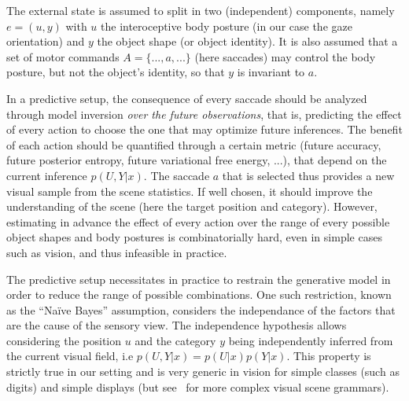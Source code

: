 The external state is assumed to split in two (independent) components, namely $e = (u,y)$ with $u$ the interoceptive body posture (in our case the gaze orientation) and $y$ the object shape (or object identity).
It is also assumed that a set of motor commands $A = \{..., a, ...\}$ (here saccades) may control the body posture, but not the object's identity, so that $y$ is invariant to $a$.

In a predictive setup, the consequence of every saccade should be analyzed through model inversion \emph{over the future observations}, that is, predicting the effect of every action to choose the one that may optimize future inferences. The benefit of each action should be quantified through a certain metric (future accuracy, future posterior entropy, future variational free energy, ...), that depend on the current inference $p(U,Y|x)$. The saccade $a$ that is selected thus provides a new visual sample from the scene statistics. If well chosen, it should improve the understanding of the scene (here the target position and category). However, estimating in advance the effect of every action over the range of every possible object shapes and body postures is combinatorially hard, even in simple cases such as vision, and thus infeasible in practice.

The predictive setup necessitates in practice to restrain the generative model in order to reduce the range of possible combinations. One such restriction, known as the ``Naïve Bayes'' assumption, considers the independance of the factors that are the cause of the sensory view.
The independence hypothesis allows considering the position $u$ and the category $y$ being independently inferred from the current visual field, i.e $p(U,Y|x) = p(U|x) p(Y|x)$. This property is strictly true in our setting and is very generic in vision for simple classes (such as digits) and simple displays (but see~\citep{Vo12} for more complex visual scene grammars).


